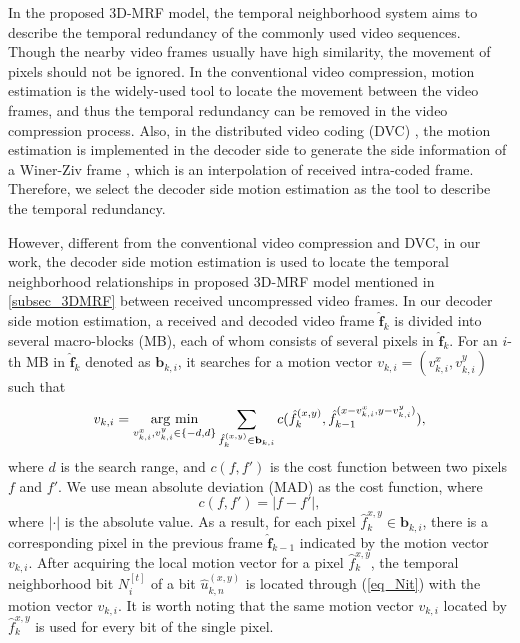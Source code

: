 \documentclass[10pt,twocolumn,twoside]{IEEEtran}
\newcommand{\argmin}{\operatornamewithlimits{arg\ min}}
\begin{document}
In the proposed 3D-MRF model, the temporal neighborhood system aims to describe the temporal redundancy of the commonly used video sequences. Though the nearby video frames usually have high similarity, the movement of pixels should not be ignored. In the conventional video compression, motion estimation is the widely-used tool to locate the movement between the video frames, and thus the temporal redundancy can be removed in the video compression process. Also, in the distributed video coding (DVC) \cite{DVC}, the motion estimation is implemented in the decoder side to generate the side information of a Winer-Ziv frame \cite{Wyner_ziv_coding}, which is an interpolation of received intra-coded frame. Therefore, we select the decoder side motion estimation as the tool to describe the temporal redundancy. 

However, different from the conventional video compression and DVC, in our work, the decoder side motion estimation is used to locate the temporal neighborhood relationships in proposed 3D-MRF model mentioned in \ref{subsec_3DMRF} between received uncompressed video frames. In our decoder side motion estimation, a received and decoded video frame $\hat{\mathbf{f}}_{k}$ is divided into several macro-blocks (MB), each of whom consists of several pixels in $\hat{\mathbf{f}}_{k}$. For an $i$-th MB in $\hat{\mathbf{f}}_{k}$ denoted as $\mathbf{b}_{k,i}$, it searches for a motion vector $v_{k,i} = (v_{k,i}^x, v_{k,i}^y)$ such that
\begin{equation}
v_{k,i} = \argmin_{v_{k,i}^x, v_{k,i}^y \in \{-d,d\}} \sum_{\hat{f}_k^{(x,y)} \in \mathbf{b}_{k,i}} c(\hat{f}_k^{(x,y)}, \hat{f}_{k-1}^{(x- v_{k,i}^x, y - v_{k,i}^y)}),
\label{eq_ME}
\end{equation}
where $d$ is the search range, and $c(f,f')$ is the cost function between two pixels $f$ and $f'$. We use mean absolute deviation (MAD) as the cost function, where
\begin{equation}
c(f,f') = |f-f'|,
\end{equation}
where $|\cdot|$ is the absolute value.
As a result, for each pixel $\hat{f}_k^{x,y} \in \mathbf{b}_{k,i}$, there is a corresponding pixel in the previous frame $\hat{\mathbf{f}}_{k-1}$ indicated by the motion vector $v_{k,i}$. After acquiring the local motion vector for a pixel $\hat{f}_k^{x,y}$, the temporal neighborhood bit $N_{i}^{[t]}$ of a bit $\hat{u}_{k,n}^{(x,y)}$ is located through (\ref{eq_Nit}) with the motion vector $v_{k,i}$. It is worth noting that the same motion vector $v_{k,i}$ located by $\hat{f}_k^{x,y}$ is used for every bit of the single pixel.
\end{document}
